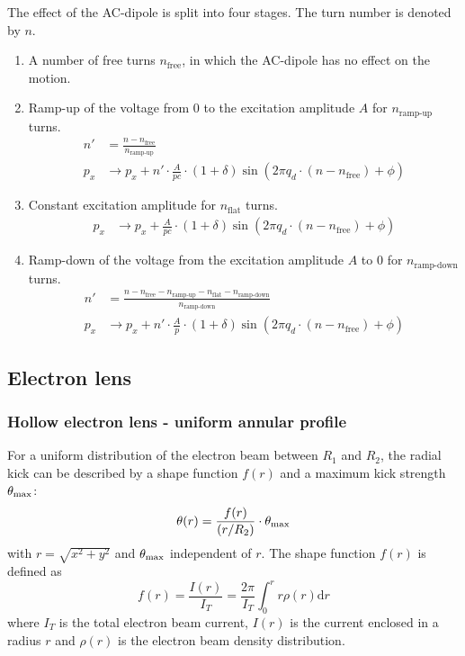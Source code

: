 \documentclass[english]{article}
\begin{document}
The effect of the AC-dipole is split into four stages. The turn number is denoted by $n$.
\begin{enumerate}
  \item A number of free turns $n_{\text{free}}$, in which the AC-dipole has no effect on the motion.
  \item Ramp-up of the voltage from $0$ to the excitation amplitude $A$ for $n_{\text{ramp-up}}$ turns.
        \begin{align}
            n' &= \frac{n-n_{\text{free}}}{n_{\text{ramp-up}}} \\
            p_x &\to p_x + n' \cdot \frac{A}{pc} \cdot(1+\delta) \sin\left(2\pi q_d\cdot(n-n_{\text{free}})+\phi\right)
        \end{align}
  \item Constant excitation amplitude for $n_{\text{flat}}$ turns.
        \begin{align}
            p_x &\to p_x + \frac{A}{pc}\cdot(1+\delta)\sin\left(2\pi q_d\cdot(n-n_{\text{free}})+\phi\right)
        \end{align}
  \item Ramp-down of the voltage from the excitation amplitude $A$ to $0$ for $n_{\text{ramp-down}}$ turns.
        \begin{align}
            n' &= \frac{n-n_{\text{free}}-n_{\text{ramp-up}}-n_{\text{flat}}-n_{\text{ramp-down}}}{n_{\text{ramp-down}}} \\
            p_x &\to p_x + n' \cdot \frac{A}{p} \cdot(1+\delta) \sin\left(2\pi q_d\cdot(n-n_{\text{free}})+\phi\right)
        \end{align}
\end{enumerate}

\subsection{Electron lens}
\label{elense}
\subsubsection{Hollow electron lens - uniform annular profile}
For a uniform distribution of the electron beam between $R_1$ and $R_2$, the radial kick can be described by a shape function $f(r)$ and a maximum kick strength $\theta_{\rm max}$:
\begin{equation}
\theta(r)=\frac{f(r)}{(r/R_2)}\cdot \theta_{\rm max}
\end{equation}
with $r=\sqrt{x^2+y^2}$ and $\theta_{\rm max}$ independent of $r$. The shape function $f(r)$ is defined as
\begin{equation}
f(r) = \frac{I(r)}{I_T}=\frac{2\pi}{I_T}\int_{0}^r r\rho(r) \mathrm{d}r
\end{equation}
where $I_T$ is the total electron beam current, $I(r)$ is the current enclosed in a radius $r$ and $\rho(r)$ is the electron beam density distribution.
\end{document}
